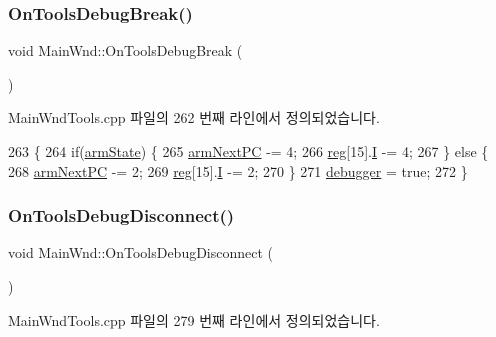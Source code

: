 \subsubsection{\texorpdfstring{On\+Tools\+Debug\+Break()}{OnToolsDebugBreak()}}
{\footnotesize\ttfamily void Main\+Wnd\+::\+On\+Tools\+Debug\+Break (\begin{DoxyParamCaption}{ }\end{DoxyParamCaption})\hspace{0.3cm}{\ttfamily [protected]}}



Main\+Wnd\+Tools.\+cpp 파일의 262 번째 라인에서 정의되었습니다.


\begin{DoxyCode}
263 \{
264   \textcolor{keywordflow}{if}(\mbox{\hyperlink{_g_b_a_8h_adeb5542a7f7ef80090a22d0133606250}{armState}}) \{
265     \mbox{\hyperlink{arm-new_8h_a7e8bf67a6667274a53fc092b97961ca4}{armNextPC}} -= 4;
266     \mbox{\hyperlink{_g_b_a_8h_ae29faba89509024ffd1a292badcedf2d}{reg}}[15].\mbox{\hyperlink{unionreg__pair_a9f6a42d56c07829d7013571eda998252}{I}} -= 4;
267   \} \textcolor{keywordflow}{else} \{
268     \mbox{\hyperlink{arm-new_8h_a7e8bf67a6667274a53fc092b97961ca4}{armNextPC}} -= 2;
269     \mbox{\hyperlink{_g_b_a_8h_ae29faba89509024ffd1a292badcedf2d}{reg}}[15].\mbox{\hyperlink{unionreg__pair_a9f6a42d56c07829d7013571eda998252}{I}} -= 2;
270   \}
271   \mbox{\hyperlink{_main_wnd_tools_8cpp_af67e2df4c66ef114f4edb85c06810007}{debugger}} = \textcolor{keyword}{true};
272 \}
\end{DoxyCode}
\mbox{\label{class_main_wnd_aecca3d7d993909f95fe965275b73efae}} 
\subsubsection{\texorpdfstring{On\+Tools\+Debug\+Disconnect()}{OnToolsDebugDisconnect()}}
{\footnotesize\ttfamily void Main\+Wnd\+::\+On\+Tools\+Debug\+Disconnect (\begin{DoxyParamCaption}{ }\end{DoxyParamCaption})\hspace{0.3cm}{\ttfamily [protected]}}



Main\+Wnd\+Tools.\+cpp 파일의 279 번째 라인에서 정의되었습니다.


